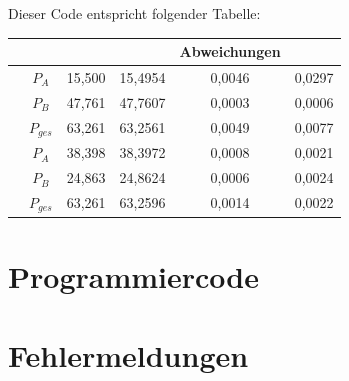 	Dieser Code entspricht folgender Tabelle:
		\begin{table}[H]
		\centering
		\renewcommand{\arraystretch}{2} %
		\setlength{\tabcolsep}{0.3em} %
		
		\begin{tabular}{|c|c|S[ table-format = 2.3]|S[ table-format = 2.3]|
				S[ table-format = 1.4]|S[ table-format = 1.4]|}
			\hline
			& {} & {} &{Abweichungen} 
			&{} \\ \hline
			&  $P_A$ & 15,500 & 15,4954 & 0,0046 & 0,0297 \\  
			& $P_B$ & 47,761 & 47,7607 & 0,0003 & 0,0006 \\  
			& $P_{ges}$ & 63,261 & 63,2561 & 0,0049 & 0,0077 \\ \hline
			& $P_A$ & 38,398 & 38,3972 & 0,0008 & 0,0021 \\  
			& $P_B$ & 24,863 & 24,8624 & 0,0006 & 0,0024 \\  
			& $P_{ges}$ & 63,261 & 63,2596 & 0,0014 & 0,0022 \\ \hline
		\end{tabular}
	\end{table}




	\newpage
	\section{Programmiercode}
	
	
	
	
	\newpage
	\section{Fehlermeldungen}
	
	
	\newpage
	\printbibliography
	

